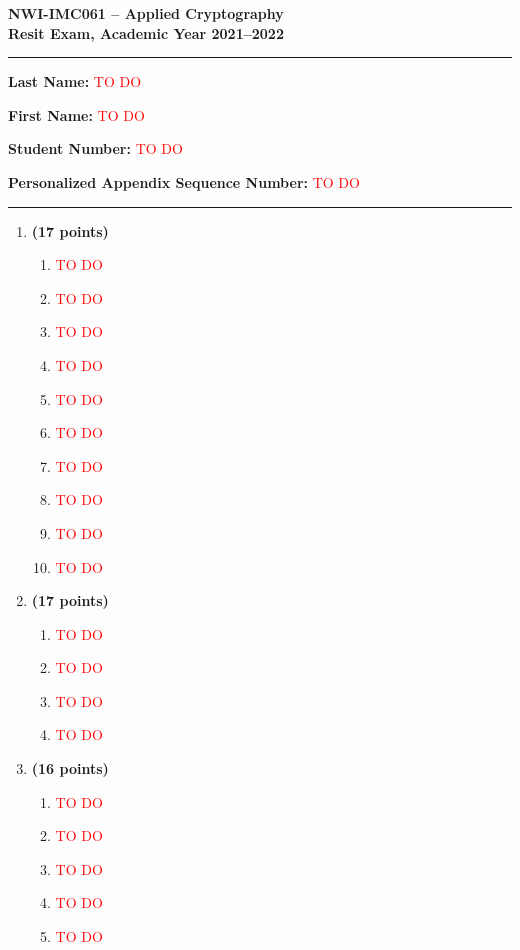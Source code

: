\documentclass[a4paper]{article}
\newcommand{\TODO}{\textcolor{red}{TO DO}}
\begin{document}
\begin{center}
  \textbf{\Large NWI-IMC061 -- Applied Cryptography}\\[4pt]
  
  \textbf{\large Resit Exam, Academic Year 2021--2022}
\end{center}

\bigskip
\hrule
\bigskip

\noindent \textbf{Last Name:} \TODO

\medskip\noindent \textbf{First Name:} \TODO

\medskip\noindent \textbf{Student Number:} \TODO

\medskip\noindent \textbf{Personalized Appendix Sequence Number:} \TODO

\bigskip
\hrule
\bigskip

\begin{enumerate}
\item \textbf{(17 points)} 
    \begin{enumerate}
    \item \TODO
    \item \TODO
    \item \TODO
    \item \TODO
    \item \TODO
    \item \TODO
    \item \TODO
    \item \TODO
    \item \TODO
    \item \TODO
    \end{enumerate}

\item \textbf{(17 points)} 
    \begin{enumerate}
    \item \TODO
    \item \TODO
    \item \TODO
    \item \TODO
    \end{enumerate}

\item \textbf{(16 points)}
    \begin{enumerate}
    \item \TODO
    \item \TODO
    \item \TODO
    \item \TODO
    \item \TODO
    \end{enumerate}


\end{enumerate}
\end{document}
